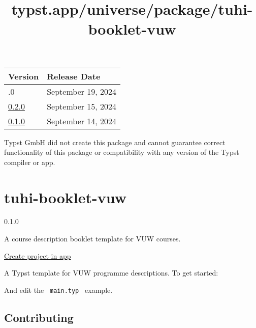 \begin{longtable}[]{@{}ll@{}}
\toprule\noalign{}
Version & Release Date \\
\midrule\noalign{}
\endhead
\bottomrule\noalign{}
\endlastfoot
0.3.0 & September 19, 2024 \\
\href{https://typst.app/universe/package/unichar/0.2.0/}{0.2.0} &
September 15, 2024 \\
\href{https://typst.app/universe/package/unichar/0.1.0/}{0.1.0} &
September 14, 2024 \\
\end{longtable}

Typst GmbH did not create this package and cannot guarantee correct
functionality of this package or compatibility with any version of the
Typst compiler or app.


\title{typst.app/universe/package/tuhi-booklet-vuw}

\label{banner}
\label{template-thumbnail}

\section{tuhi-booklet-vuw}\label{tuhi-booklet-vuw}

{ 0.1.0 }

A course description booklet template for VUW courses.

\href{/app?template=tuhi-booklet-vuw&version=0.1.0}{Create project in
app}

\label{readme}
A Typst template for VUW programme descriptions. To get started:

\begin{Shaded}
\begin{Highlighting}[]
\end{Highlighting}
\end{Shaded}

And edit the \texttt{\ main.typ\ } example.


\subsection{Contributing}\label{contributing}

